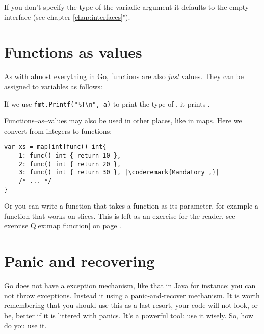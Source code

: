 If you don't specify the type of the variadic argument it defaults to the
empty interface  (see chapter
\ref{chap:interfaces}").

\section{Functions as values}
\label{sec:functions as values}
As with almost everything in Go, functions are also \emph{just} values.
They can be assigned to variables as follows:

If we use \lstinline{fmt.Printf("%T\n", a)} to print the type of
, it prints .

Functions--as--values may also be used in other places, like in maps.
Here we convert from integers to functions:
\begin{lstlisting}[caption=Functions as values in maps]
var xs = map[int]func() int{
    1: func() int { return 10 },
    2: func() int { return 20 },
    3: func() int { return 30 }, |\coderemark{Mandatory ,}|
    /* ... */
}
\end{lstlisting}
Or you can write a function that takes a function as its parameter, for
example a  function that works on  slices. This is
left as an exercise for the reader, see exercise Q\ref{ex:map function}
on page \pageref{ex:map function}.

\section{Panic and recovering}
\label{sec:panic}
Go does not have a exception mechanism, like that in Java for instance: you can not throw exceptions.
Instead it using a panic-and-recover mechanism. It is worth remembering that you should use this as
a last resort, your code will not look, or be, better if it is littered with panics. It's a powerful tool:
use it wisely. So, how do you use it.


